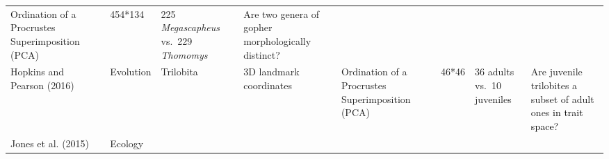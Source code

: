 \documentclass[]{article}
\begin{document}
\begin{longtable}[]{@{}llllllll@{}}
\begin{minipage}[t]{0.11\columnwidth}
Ordination of a Procrustes Superimposition (PCA)\strut
\end{minipage} & \begin{minipage}[t]{0.08\columnwidth}\raggedright\strut
454*134\strut
\end{minipage} & \begin{minipage}[t]{0.11\columnwidth}\raggedright\strut
225 \emph{Megascapheus} vs.~229 \emph{Thomomys}\strut
\end{minipage} & \begin{minipage}[t]{0.12\columnwidth}\raggedright\strut
Are two genera of gopher morphologically distinct?\strut
\end{minipage}\tabularnewline
\begin{minipage}[t]{0.08\columnwidth}\raggedright\strut
Hopkins and Pearson (2016)\strut
\end{minipage} & \begin{minipage}[t]{0.09\columnwidth}\raggedright\strut
Evolution\strut
\end{minipage} & \begin{minipage}[t]{0.09\columnwidth}\raggedright\strut
Trilobita\strut
\end{minipage} & \begin{minipage}[t]{0.11\columnwidth}\raggedright\strut
3D landmark coordinates\strut
\end{minipage} & \begin{minipage}[t]{0.11\columnwidth}\raggedright\strut
Ordination of a Procrustes Superimposition (PCA)\strut
\end{minipage} & \begin{minipage}[t]{0.08\columnwidth}\raggedright\strut
46*46\strut
\end{minipage} & \begin{minipage}[t]{0.11\columnwidth}\raggedright\strut
36 adults vs.~10 juveniles\strut
\end{minipage} & \begin{minipage}[t]{0.12\columnwidth}\raggedright\strut
Are juvenile trilobites a subset of adult ones
\textcolor{black}{in trait space}?\strut
\end{minipage}\tabularnewline
\begin{minipage}[t]{0.08\columnwidth}\raggedright\strut
Jones et al. (2015)\strut
\end{minipage} & \begin{minipage}[t]{0.09\columnwidth}\raggedright\strut
Ecology\strut
\end{minipage} & \begin{minipage}[t]{0.09\columnwidth}\raggedright\strut

\end{minipage}
\end{longtable}
\end{document}
